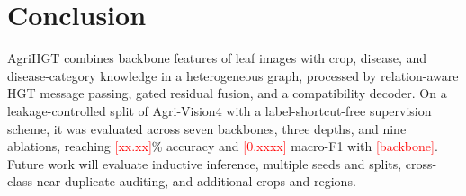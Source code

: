 \documentclass[conference]{IEEEtran}
\newcommand{\TBD}[1]{\textcolor{red}{[#1]}}
\begin{document}
\section{Conclusion}
AgriHGT combines backbone features of leaf images with crop, disease, and disease-category knowledge in a heterogeneous graph, processed by relation-aware HGT message passing, gated residual fusion, and a compatibility decoder. On a leakage-controlled split of Agri-Vision4 with a label-shortcut-free supervision scheme, it was evaluated across seven backbones, three depths, and nine ablations, reaching \TBD{xx.xx}\% accuracy and \TBD{0.xxxx} macro-F1 with \TBD{backbone}. Future work will evaluate inductive inference, multiple seeds and splits, cross-class near-duplicate auditing, and additional crops and regions.


{\renewcommand{\footnotesize}{\scriptsize}
}
\end{document}
